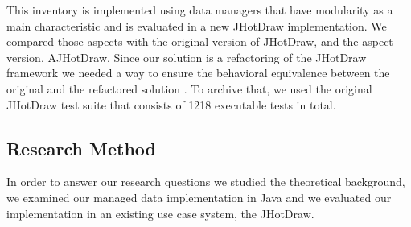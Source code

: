 



This inventory is implemented using data managers that have modularity as a main characteristic and is evaluated in a new JHotDraw implementation.
We compared those aspects with the original version of JHotDraw, and the aspect version, AJHotDraw. 
Since our solution is a refactoring of the JHotDraw framework we needed a way to ensure the behavioral equivalence between the original and the refactored solution \cite{fowler2009refactoring}.
To archive that, we used the original JHotDraw test suite that consists of 1218 executable tests in total.

\subsection{Research Method}\label{Research Method}
In order to answer our research questions we studied the theoretical background, we examined our managed data implementation in Java and we evaluated our implementation in an existing use case system, the JHotDraw.

